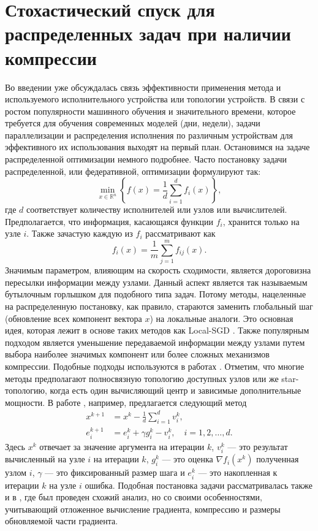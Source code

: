 \section{Стохастический спуск для распределенных задач при наличии компрессии} \label{raspr}
  Во введении уже обсуждалась связь эффективности применения метода и используемого исполнительного устройства или топологии устройств. В связи с ростом популярности машинного обучения и значительного времени, которое требуется для обучения современных моделей (дни, недели), задачи параллелизации и распределения исполнения по различным устройствам для эффективного их использования выходят на первый план. Остановимся на задаче распределенной оптимизации немного подробнее. Часто постановку задачи распределенной, или федеративной, оптимизации формулируют так:
  \begin{equation} \label{raspr_task}
    \min_{x \in \mathbb{R}^n}\left\{f(x)=\frac{1}{d} \sum_{i=1}^d f_i(x)\right\},
  \end{equation}
  где $d$ соответствует количеству исполнителей или узлов или вычислителей. Предполагается, что информация, касающаяся функции $f_i$, хранится только на узле $i$. Также зачастую каждую из $f_i$ рассматривают как
  $$
    f_i(x) = \frac{1}{m} \sum_{j=1}^m f_{ij}(x).
  $$ 
  Значимым параметром, влияющим на скорость сходимости, является дороговизна пересылки информации между узлами. Данный аспект является так называемым бутылочным горлышком для подобного типа задач. Потому методы, нацеленные на распределенную постановку, как правило, стараются заменить глобальный шаг (обновление всех компонент вектора $x$) на локальные аналоги. Это основная идея, которая лежит в основе таких методов как Local-SGD \cite{Stich2019LocalSC}. Также популярным подходом является уменьшение передаваемой информации между узлами путем выбора наиболее значимых компонент или более сложных механизмов компрессии. Подобные подходы используются в работах \cite{qlsgd, qsgd, err_fdbk}. Отметим, что многие методы предполагают полносвязную топологию доступных узлов или же star-топологию, когда есть один вычисляющий центр и зависимые дополнительные мощности. 
  В работе \cite{GorbunovKMR20}, например, предлагается следующий метод
  $$
  \begin{aligned} 
    x^{k+1} &=x^k-\frac{1}{d} \sum_{i=1}^d v_i^k, \\ 
    e_i^{k+1} &=e_i^k + \gamma g_i^k - v_i^k, \quad i=1,2, \ldots, d . 
  \end{aligned}
  $$
  Здесь $x^k$ отвечает за значение аргумента на итерации $k$, $v_i^k$ --- это результат вычисленный на узле $i$ на итерации $k$, $g_i^k$ --- это оценка $\nabla f_i(x^k)$ полученная узлом $i$, $\gamma$ --- это фиксированный размер шага и $e_i^k$ --- это накопленная к итерации $k$ на узле $i$ ошибка.  Подобная постановка задачи рассматривалась также и в \cite{err_fdbk}, где был проведен схожий анализ, но со своими особенностями, учитывающий отложенное вычисление градиента, компрессию и размеры обновляемой части градиента.
